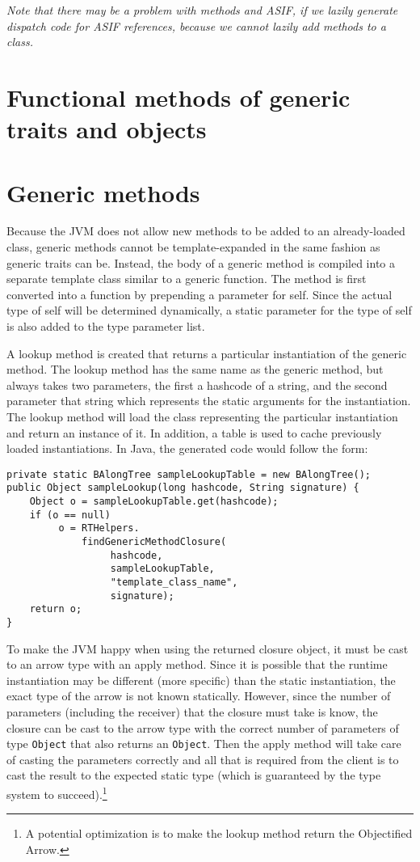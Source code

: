 \documentclass[11pt]{article}
\begin{document}
{\it Note that there may be a problem with methods and ASIF, if we lazily generate dispatch code for ASIF references, because we cannot lazily add methods to a class. }

\section{Functional methods of generic traits and objects}




\section{Generic methods}

Because the JVM does not allow new methods to be added to an already-loaded class, generic methods cannot be template-expanded
in the same fashion as generic traits can be.  Instead, the body of a generic method is compiled into a separate template class
similar to a generic function.  The method is first converted into a function by prepending a parameter for self.  Since the actual type
of self will be determined dynamically, a static parameter for the type of self is also added to the type parameter list.

A lookup method is created that returns a particular instantiation of the generic method.
The lookup method has the same name as the generic method, but always takes two parameters, the first a hashcode of a string, 
and the second parameter that string which represents the static arguments for the instantiation.  The lookup
method will load the class representing the particular instantiation and return an instance of it.  In addition, a table is used to cache previously loaded
instantiations.  In Java, the generated code would follow the form:
\begin{verbatim}
private static BAlongTree sampleLookupTable = new BAlongTree();
public Object sampleLookup(long hashcode, String signature) {
    Object o = sampleLookupTable.get(hashcode);
    if (o == null) 
         o = RTHelpers.
             findGenericMethodClosure(
                  hashcode,
                  sampleLookupTable,
                  "template_class_name",
                  signature);
    return o;
}
\end{verbatim}

To make the JVM happy when using the returned closure object, it must be cast to an arrow type with an apply method.
Since it is possible that the runtime instantiation may be different (more specific) than the static instantiation,
the exact type of the arrow is not known statically.  However, since the number of parameters
(including the receiver) that the closure must take is know, the closure can be cast to the arrow type
with the correct number of parameters of type {\tt Object} that also returns an {\tt Object}.  Then the apply
method will take care of casting the parameters correctly and all that is required from the client
is to cast the result to the expected static type (which is guaranteed by the type system to succeed).\footnote{A potential
optimization is to make the lookup method return the Objectified Arrow.}
\end{document}
